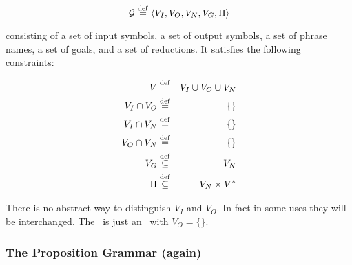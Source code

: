\begin{samepage}
\begin{equation}
{\cal G} \stackrel{\rm def}{=} \langle V_I, V_O, V_N, V_G, \Pi\rangle
\label{IOGrammarDefinition}
\end{equation}
\index{$\Pi$}

\noindent
consisting of a set of input symbols, a set of output symbols, a set
of phrase names, a set of goals, and a set of reductions.  It
satisfies the following constraints:

\begin{eqnarray*}
     V                &\stackrel{\rm def}{=}& V_I \cup V_O \cup V_N    \\
     V_I \cap V_O     &\stackrel{\rm def}{=}& \{\}				      \\
     V_I \cap V_N     &\stackrel{\rm def}{=}& \{\}				      \\
     V_O \cap V_N     &\stackrel{\rm def}{=}& \{\}				      \\
     V_G	            &\stackrel{\rm def}{\subseteq}& V_N			    \\
     \Pi	            &\stackrel{\rm def}{\subseteq}& V_N\times V^*
\end{eqnarray*}
\end{samepage}


\noindent
There is no abstract way to distinguish $V_I$ and $V_O$.  
In fact in some uses they will be interchanged.  
The \cfg\ is just an \iog\ with $V_O=\{\}$.  

\subsubsection{The Proposition Grammar (again)}

